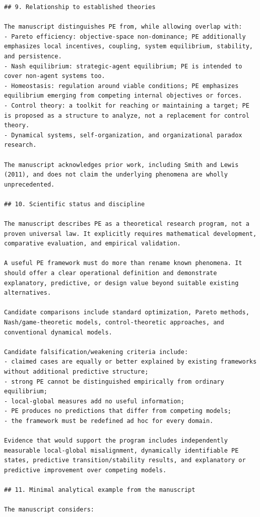 \documentclass[10pt,a4paper]{article}
\begin{document}
\begin{lstlisting}
## 9. Relationship to established theories

The manuscript distinguishes PE from, while allowing overlap with:
- Pareto efficiency: objective-space non-dominance; PE additionally emphasizes local incentives, coupling, system equilibrium, stability, and persistence.
- Nash equilibrium: strategic-agent equilibrium; PE is intended to cover non-agent systems too.
- Homeostasis: regulation around viable conditions; PE emphasizes equilibrium emerging from competing internal objectives or forces.
- Control theory: a toolkit for reaching or maintaining a target; PE is proposed as a structure to analyze, not a replacement for control theory.
- Dynamical systems, self-organization, and organizational paradox research.

The manuscript acknowledges prior work, including Smith and Lewis (2011), and does not claim the underlying phenomena are wholly unprecedented.

## 10. Scientific status and discipline

The manuscript describes PE as a theoretical research program, not a proven universal law. It explicitly requires mathematical development, comparative evaluation, and empirical validation.

A useful PE framework must do more than rename known phenomena. It should offer a clear operational definition and demonstrate explanatory, predictive, or design value beyond suitable existing alternatives.

Candidate comparisons include standard optimization, Pareto methods, Nash/game-theoretic models, control-theoretic approaches, and conventional dynamical models.

Candidate falsification/weakening criteria include:
- claimed cases are equally or better explained by existing frameworks without additional predictive structure;
- strong PE cannot be distinguished empirically from ordinary equilibrium;
- local-global measures add no useful information;
- PE produces no predictions that differ from competing models;
- the framework must be redefined ad hoc for every domain.

Evidence that would support the program includes independently measurable local-global misalignment, dynamically identifiable PE states, predictive transition/stability results, and explanatory or predictive improvement over competing models.

## 11. Minimal analytical example from the manuscript

The manuscript considers:


\end{lstlisting}
\end{document}

